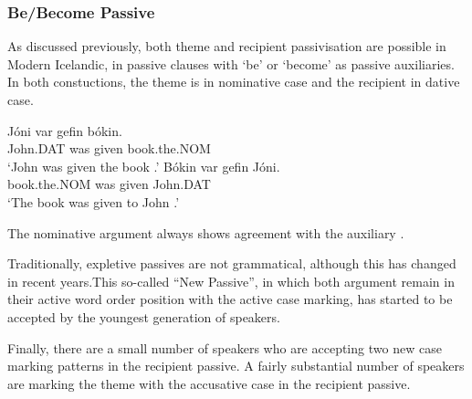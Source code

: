 \subsubsection{Be/Become Passive}
As discussed previously, both theme and recipient passivisation are possible in Modern Icelandic, in passive clauses with `be' or `become' as passive auxiliaries. In both constuctions, the theme is in nominative case and the recipient in dative case. 

\begin{exe}
\ex 
\begin{xlist}
\ex \gll J\'{o}ni var gefin b\'{o}kin.\\
John.DAT was given book.the.NOM\\
\trans `John was given the book \citep{Holmberg.1995,Bardal.2001}.'
\ex \gll B\'{o}kin var gefin J\'{o}ni.\\
book.the.NOM was given John.DAT\\
\trans `The book was given to John \citep{Holmberg.1995,Bardal.2001}.'
\end{xlist}
The nominative argument always shows agreement with the auxiliary \citep[98]{Arnadottir.2013}.
\end{exe}
\begin{exe}
\ex
\begin{xlist}
\end{xlist}
\end{exe}
Traditionally, expletive passives are not grammatical, although this has changed in recent years.This so-called ``New Passive'', in which both argument remain in their active word order position with the active case marking, has started to be accepted by the youngest generation of speakers. 
\begin{exe}
\end{exe}
Finally, there are a small number of speakers who are accepting two new case marking patterns in the recipient passive. A fairly substantial number of speakers are marking the theme with the accusative case in the recipient passive.

